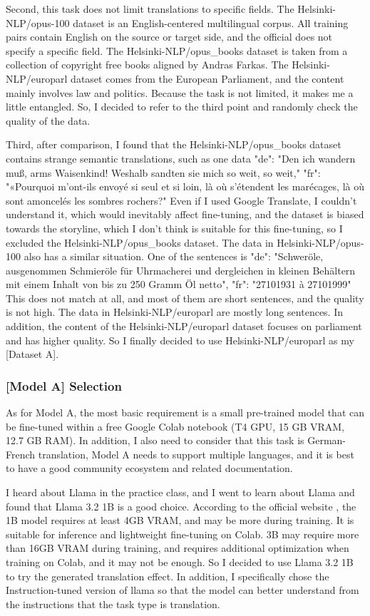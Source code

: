 Second, this task does not limit translations to specific fields.
The Helsinki-NLP/opus-100 dataset is an English-centered multilingual corpus.
All training pairs contain English on the source or target side,
and the official does not specify a specific field.
The Helsinki-NLP/opus\_books dataset is taken from
a collection of copyright free books aligned by Andras Farkas.
The Helsinki-NLP/europarl dataset comes from the European Parliament, 
and the content mainly involves law and politics. 
Because the task is not limited, it makes me a little entangled.
So, I decided to refer to the third point and randomly check the quality of the data.

Third, after comparison,
I found that the Helsinki-NLP/opus\_books dataset contains strange semantic translations, 
such as one data "de": "Den ich wandern muß, arms Waisenkind! Weshalb sandten sie mich so weit, so weit," 
"fr": "«Pourquoi m'ont-ils envoyé si seul et si loin, là où s'étendent les marécages, 
là où sont amoncelés les sombres rochers?" 
Even if I used Google Translate, I couldn't understand it, 
which would inevitably affect fine-tuning, 
and the dataset is biased towards the storyline, 
which I don't think is suitable for this fine-tuning, 
so I excluded the Helsinki-NLP/opus\_books dataset.
The data in Helsinki-NLP/opus-100 also has a similar situation. 
One of the sentences is "de": "Schweröle, ausgenommen Schmieröle für 
Uhrmacherei und dergleichen in kleinen Behältern mit einem Inhalt von 
bis zu 250 Gramm Öl netto", "fr": "27101931 à 27101999" 
This does not match at all, and most of them are short sentences, 
and the quality is not high. The data in Helsinki-NLP/europarl are mostly long sentences. 
In addition, the content of the Helsinki-NLP/europarl dataset focuses on parliament and has higher quality. 
So I finally decided to use Helsinki-NLP/europarl as my [Dataset A].

\subsubsection{[Model A] Selection}
As for Model A, 
the most basic requirement is a small pre-trained model 
that can be fine-tuned within a free Google Colab notebook 
(T4 GPU, 15 GB VRAM, 12.7 GB RAM). 
In addition, I also need to consider that this task is German-French translation, 
Model A needs to support multiple languages, 
and it is best to have a good community ecosystem and related documentation.


I heard about Llama in the practice class, 
and I went to learn about Llama and found that Llama 3.2 1B is a good choice. 
According to the official website \cite{llama-website}, 
the 1B model requires at least 4GB VRAM, and may be more during training. 
It is suitable for inference and lightweight fine-tuning on Colab.
3B may require more than 16GB VRAM during training, 
and requires additional optimization when training on Colab, and it may not be enough. 
So I decided to use Llama 3.2 1B to try the generated translation effect.
In addition, I specifically chose the Instruction-tuned version of llama 
so that the model can better understand from the instructions that the task type is translation.

